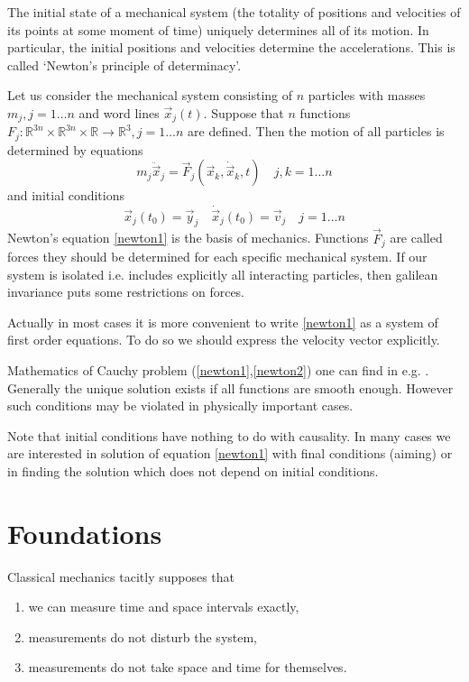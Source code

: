\documentclass[11pt]{book}
\begin{document}
The initial state of a mechanical system (the totality of positions and
velocities of its points at some moment of time) uniquely determines all of
its motion. In particular, the initial positions and velocities determine the accelerations.
This is called `Newton's principle of determinacy'.

Let us consider the mechanical system consisting of $n$ particles 
with masses $m_j,j=1\ldots n$ and word lines $\vec x_j(t)$.
Suppose that $n$ functions  
$F_j:\mathbb{R}^{3 n}\times\mathbb{R}^{3 n}\times\mathbb{R}\rightarrow\mathbb{R}^3,j=1\ldots n$ 
are defined. Then the motion of all particles is determined by equations
\begin{equation}
    m_j \ddot \vec x_j=\vec F_j(\vec x_k,\dot \vec x_k,t) \quad j,k=1\ldots n \label {newton1}
\end{equation}
and initial conditions
\begin{equation}
    \vec x_j(t_0)=\vec y_j\quad\dot \vec x_j(t_0)=\vec v_j  \quad j=1\ldots n \label {newton2}
\end{equation}
Newton's equation \eqref{newton1} is  the basis of mechanics. Functions $\vec F_j$
are called forces they should be determined  for each specific mechanical system. If our system
is isolated i.e. includes explicitly all interacting particles, then galilean invariance puts some restrictions on forces.

Actually in most cases it is more convenient to write
\eqref{newton1} as a system of first order equations. 
To do so we should express the  velocity vector explicitly.

Mathematics of  Cauchy problem (\ref{newton1},\ref{newton2}) 
one can find in e.g. \cite{arnold-ode}. Generally the unique solution exists if
all functions are smooth enough. However such conditions may be violated in physically
important cases.

Note that initial conditions have nothing to do with causality. In many cases we are
interested in solution of equation \eqref{newton1} with final 
conditions (aiming) or in finding the solution which does not 
depend on initial conditions.

\section{Foundations}
\label{cm-foundations}


Classical mechanics tacitly supposes that
\begin{enumerate}
    \item we can measure time and space intervals exactly,
    \item measurements do not disturb the system,
    \item measurements do not take space and time for themselves.
\end{enumerate}







\printbibliography[
heading=bibintoc,
title={References}
] 
\clearpage
\end{document}
